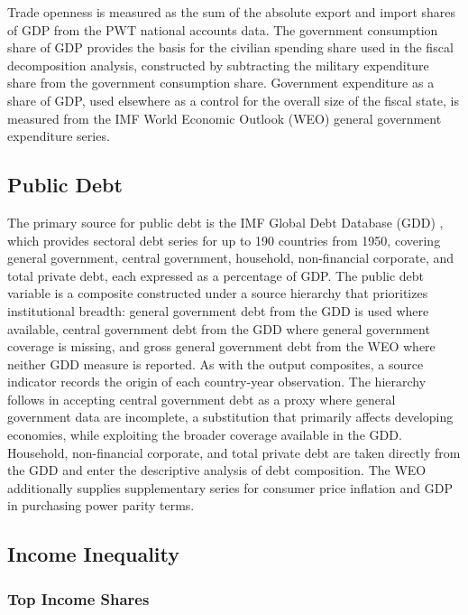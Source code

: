 \documentclass[12pt, titlepage]{article}
\numberwithin{equation}{section}
\begin{document}
Trade openness is measured as the sum of the absolute export and import
shares of GDP from the PWT national accounts data. The government consumption
share of GDP provides the basis for the civilian spending share used in the
fiscal decomposition analysis, constructed by subtracting the military
expenditure share from the government consumption share. Government
expenditure as a share of GDP, used elsewhere as a control for the overall
size of the fiscal state, is measured from the IMF World Economic Outlook (WEO)
general government expenditure series.

\subsection{Public Debt}

The primary source for public debt is the IMF Global Debt Database (GDD)
\citep{MbayeMorenoBadiaChae2018}, which provides sectoral debt series for up
to 190 countries from 1950, covering general government, central government,
household, non-financial corporate, and total private debt, each expressed as
a percentage of GDP. The public debt variable is a composite constructed
under a source hierarchy that prioritizes institutional breadth: general
government debt from the GDD is used where available, central government debt
from the GDD where general government coverage is missing, and gross general
government debt from the WEO where neither GDD measure is reported. As with
the output composites, a source indicator records the origin of each
country-year observation. The hierarchy follows \cite{Reinhart2011} in
accepting central government debt as a proxy where general government data
are incomplete, a substitution that primarily affects developing economies,
while exploiting the broader coverage available in the GDD. Household,
non-financial corporate, and total private debt are taken directly from the
GDD and enter the descriptive analysis of debt composition. The WEO
additionally supplies supplementary series for consumer price inflation and
GDP in purchasing power parity terms.

\subsection{Income Inequality}

\subsubsection{Top Income Shares}
\end{document}
